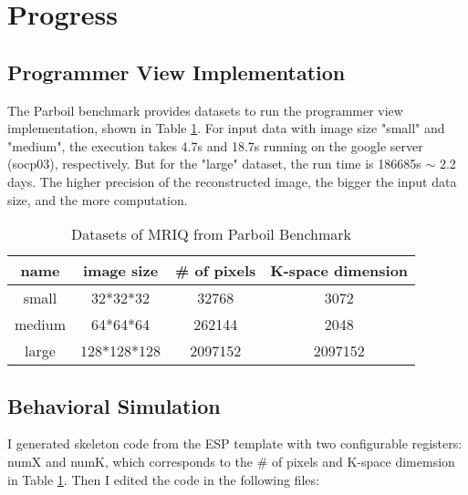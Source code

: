 \vspace{-4mm}
\section{Progress}

\subsection{Programmer View Implementation}
The Parboil benchmark provides datasets to run the programmer view implementation, shown in Table \ref{tab-1}. For input data with image size "small" and "medium", the execution takes 4.7s and 18.7s running on the google server (socp03), respectively. But for the "large" dataset, the run time is 186685s $ \sim$ 2.2 days. The higher precision of the reconstructed image, the bigger the input data size, and the more computation.
\begin{table}[h!]
    \centering
    \begin{tabular}{c|c|c|c}
    \hline
       name  & image size & \# of pixels & K-space dimension  \\
    \hline
        small  & 32*32*32 & 32768 & 3072 \\
        medium & 64*64*64 & 262144 & 2048\\
        large & 128*128*128 & 2097152 & 2097152\\
        \hline
    \end{tabular}
    \caption{Datasets of MRIQ from Parboil Benchmark}
    \label{tab-1}
\end{table}

\subsection{Behavioral Simulation}
I generated skeleton code from the ESP template with two configurable registers: numX and numK, which corresponds to the \# of pixels and K-space dimemsion in Table \ref{tab-1}. Then I edited the code in the following files:\\

